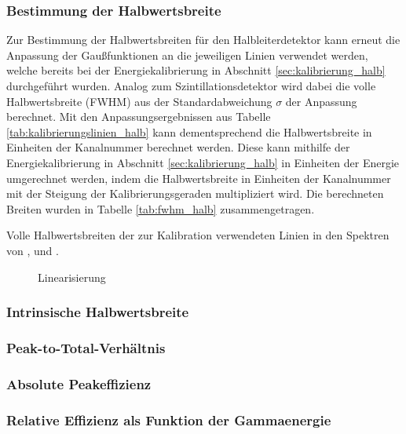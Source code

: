 \documentclass[11pt, a4paper]{article}
\numberwithin{equation}{section}
\begin{document}
\subsubsection{Bestimmung der Halbwertsbreite}
Zur Bestimmung der Halbwertsbreiten für den Halbleiterdetektor kann erneut die Anpassung der Gaußfunktionen an die jeweiligen Linien verwendet werden, welche bereits bei der Energiekalibrierung in Abschnitt \ref{sec:kalibrierung_halb} durchgeführt wurden.
Analog zum Szintillationsdetektor wird dabei die volle Halbwertsbreite (FWHM) aus der Standardabweichung $\sigma$ der Anpassung berechnet.
Mit den Anpassungsergebnissen aus Tabelle \ref{tab:kalibrierungslinien_halb} kann dementsprechend die Halbwertsbreite in Einheiten der Kanalnummer berechnet werden.
Diese kann mithilfe der Energiekalibrierung in Abschnitt \ref{sec:kalibrierung_halb} in Einheiten der Energie umgerechnet werden, indem die Halbwertsbreite in Einheiten der Kanalnummer mit der Steigung der Kalibrierungsgeraden multipliziert wird.
Die berechneten Breiten wurden in Tabelle \ref{tab:fwhm_halb} zusammengetragen.
\begin{table}[ht]
	\centering
	
	\caption{Volle Halbwertsbreiten der zur Kalibration verwendeten Linien in den Spektren von ,  und .}
	\label{tab:fwhm_halb}
\end{table}

\begin{figure}[h]
	\centering
	
	\caption{Linearisierung}
	\label{fig:lin_fwhm}
\end{figure}


\subsubsection{Intrinsische Halbwertsbreite}

\subsubsection{Peak-to-Total-Verhältnis}

\subsubsection{Absolute Peakeffizienz}

\subsubsection{Relative Effizienz als Funktion der Gammaenergie}
\end{document}
